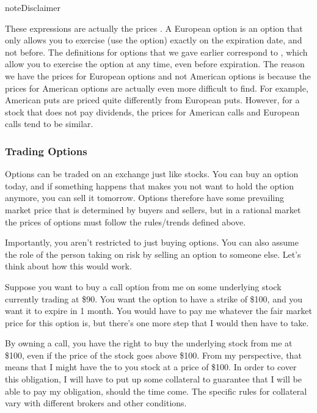 \documentclass[letterpaper,10pt,english]{jupyterBook}
\begin{document}
\begin{sphinxadmonition}{note}{Disclaimer}

\sphinxAtStartPar
These expressions are actually the prices . A European option is an option that only allows you to exercise (use the option) exactly on the expiration date, and not before. The definitions for options that we gave earlier correspond to , which allow you to exercise the option at any time, even before expiration. The reason we have the prices for European options and not American options is because the prices for American options are actually even more difficult to find. For example, American puts are priced quite differently from European puts. However, for a stock that does not pay dividends, the prices for American calls and European calls tend to be similar.
\end{sphinxadmonition}


\subsubsection{Trading Options}
\label{\detokenize{content/10-finance/options:trading-options}}
\sphinxAtStartPar
Options can be traded on an exchange just like stocks. You can buy an option today, and if something happens that makes you not want to hold the option anymore, you can sell it tomorrow. Options therefore have some prevailing market price that is determined by buyers and sellers, but in a rational market the prices of options must follow the rules/trends defined above.

\sphinxAtStartPar
Importantly, you aren’t restricted to just buying options. You can also assume the role of the person taking on risk by selling an option to someone else. Let’s think about how this would work.

\sphinxAtStartPar
Suppose you want to buy a call option from me on some underlying stock currently trading at \$90. You want the option to have a strike of \$100, and you want it to expire in 1 month. You would have to pay me whatever the fair market price for this option is, but there’s one more step that I would then have to take.

\sphinxAtStartPar
By owning a call, you have the right to buy the underlying stock from me at \$100, even if the price of the stock goes above \$100. From my perspective, that means that I might have the  to  you stock at a price of \$100. In order to cover this obligation, I will have to put up some collateral to guarantee that I will be able to pay my obligation, should the time come. The specific rules for collateral vary with different brokers and other conditions.
\end{document}
